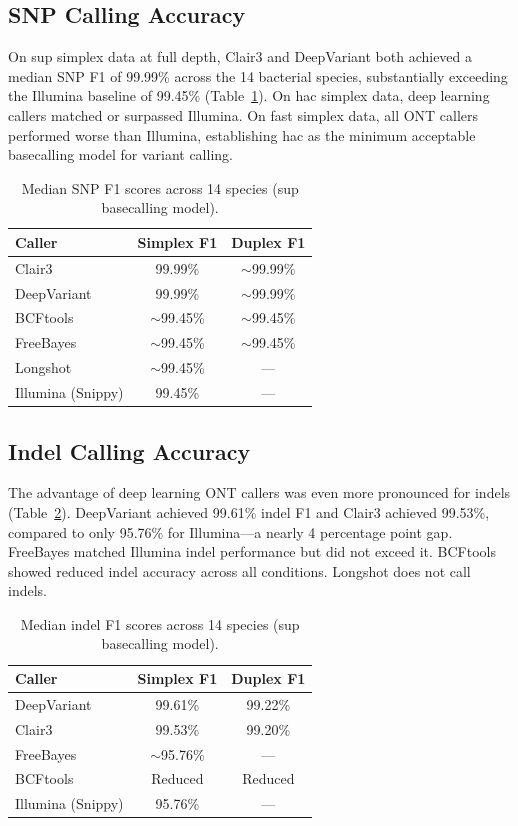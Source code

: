 \documentclass[11pt]{article}
\begin{document}
\subsection{SNP Calling Accuracy}

On sup simplex data at full depth, Clair3 and DeepVariant both achieved a median SNP F1 of 99.99\% across the 14 bacterial species, substantially exceeding the Illumina baseline of 99.45\% (Table~\ref{tab:snp}). On hac simplex data, deep learning callers matched or surpassed Illumina. On fast simplex data, all ONT callers performed worse than Illumina, establishing hac as the minimum acceptable basecalling model for variant calling.

\begin{table}[h]
\centering
\caption{Median SNP F1 scores across 14 species (sup basecalling model).}
\label{tab:snp}
\begin{tabular}{lcc}
\toprule
Caller & Simplex F1 & Duplex F1 \\
\midrule
Clair3 & 99.99\% & $\sim$99.99\% \\
DeepVariant & 99.99\% & $\sim$99.99\% \\
BCFtools & $\sim$99.45\% & $\sim$99.45\% \\
FreeBayes & $\sim$99.45\% & $\sim$99.45\% \\
Longshot & $\sim$99.45\% & --- \\
\midrule
Illumina (Snippy) & 99.45\% & --- \\
\bottomrule
\end{tabular}
\end{table}

\subsection{Indel Calling Accuracy}

The advantage of deep learning ONT callers was even more pronounced for indels (Table~\ref{tab:indel}). DeepVariant achieved 99.61\% indel F1 and Clair3 achieved 99.53\%, compared to only 95.76\% for Illumina---a nearly 4 percentage point gap. FreeBayes matched Illumina indel performance but did not exceed it. BCFtools showed reduced indel accuracy across all conditions. Longshot does not call indels.

\begin{table}[h]
\centering
\caption{Median indel F1 scores across 14 species (sup basecalling model).}
\label{tab:indel}
\begin{tabular}{lcc}
\toprule
Caller & Simplex F1 & Duplex F1 \\
\midrule
DeepVariant & 99.61\% & 99.22\% \\
Clair3 & 99.53\% & 99.20\% \\
FreeBayes & $\sim$95.76\% & --- \\
BCFtools & Reduced & Reduced \\
\midrule
Illumina (Snippy) & 95.76\% & --- \\
\bottomrule
\end{tabular}
\end{table}
\end{document}
